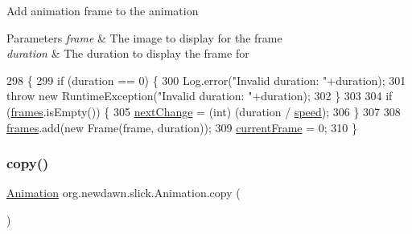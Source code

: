 Add animation frame to the animation


\begin{DoxyParams}{Parameters}
{\em frame} & The image to display for the frame \\
\hline
{\em duration} & The duration to display the frame for \\
\hline
\end{DoxyParams}

\begin{DoxyCode}
298                                                     \{
299         \textcolor{keywordflow}{if} (duration == 0) \{
300             Log.error(\textcolor{stringliteral}{"Invalid duration: "}+duration);
301             \textcolor{keywordflow}{throw} \textcolor{keyword}{new} RuntimeException(\textcolor{stringliteral}{"Invalid duration: "}+duration);
302         \}
303 
304         \textcolor{keywordflow}{if} (\mbox{\hyperlink{classorg_1_1newdawn_1_1slick_1_1_animation_a39f0c6a16e479985b22f7dd3bb781bf7}{frames}}.isEmpty()) \{
305             \mbox{\hyperlink{classorg_1_1newdawn_1_1slick_1_1_animation_a28280195bf1df3c929ca69b1c4d59443}{nextChange}} = (int) (duration / \mbox{\hyperlink{classorg_1_1newdawn_1_1slick_1_1_animation_a0ccda8ed8082763a52d2819e414dd5b9}{speed}});
306         \} 
307         
308         \mbox{\hyperlink{classorg_1_1newdawn_1_1slick_1_1_animation_a39f0c6a16e479985b22f7dd3bb781bf7}{frames}}.add(\textcolor{keyword}{new} Frame(frame, duration));
309         \mbox{\hyperlink{classorg_1_1newdawn_1_1slick_1_1_animation_a358e1f2b9d9a05f83a416405e6bcd332}{currentFrame}} = 0;
310     \}
\end{DoxyCode}
\mbox{\label{classorg_1_1newdawn_1_1slick_1_1_animation_a1b958cdfbd5bc6477fc4c721e152314a}} 
\subsubsection{\texorpdfstring{copy()}{copy()}}
{\footnotesize\ttfamily \mbox{\hyperlink{classorg_1_1newdawn_1_1slick_1_1_animation}{Animation}} org.\+newdawn.\+slick.\+Animation.\+copy (\begin{DoxyParamCaption}{ }\end{DoxyParamCaption})\hspace{0.3cm}{\ttfamily [inline]}}

